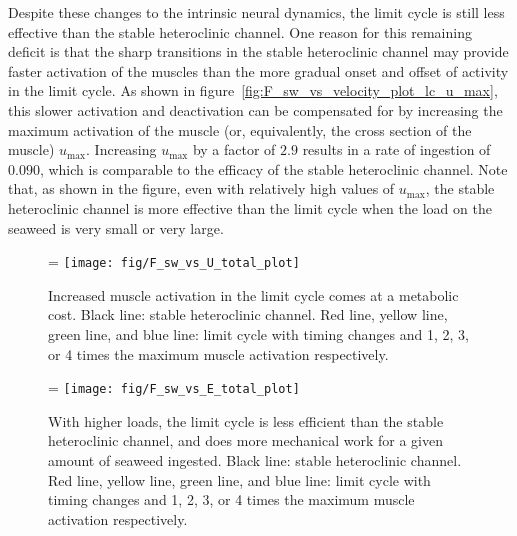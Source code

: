 Despite these changes to the intrinsic neural dynamics, the limit cycle is
still less effective than the stable heteroclinic channel.  One reason for
this remaining deficit is that the sharp transitions in the stable heteroclinic channel may
provide faster activation of the muscles than the more gradual onset and
offset of activity in the limit cycle.  As shown in
figure~\ref{fig:F_sw_vs_velocity_plot_lc_u_max}, this slower activation and
deactivation can be compensated
for by increasing the maximum activation of the muscle (or, equivalently,
the cross section of the muscle) $u_\textrm{max}$.  Increasing
$u_\textrm{max}$ by a factor of $2.9$ results in a rate of ingestion of
$0.090$, which is comparable to the efficacy of the stable heteroclinic
channel.  Note that, as shown in the figure, even with relatively high
values of $u_\textrm{max}$, the stable heteroclinic channel is more
effective than the limit cycle when the load on the seaweed is very
small or very large.

\begin{figure}
    \ifthesis
        \linewidth
    \else
        \figwidth=\linewidth
    \fi
    \centering
    \texttt{[image: fig/F\_sw\_vs\_U\_total\_plot]}
    \caption[Metabolic cost of increased muscle activation]{
        Increased muscle activation in the limit cycle comes at a
        metabolic cost.  Black line: stable heteroclinic channel.  Red line,
        yellow line, green line, and blue line: limit cycle with timing changes
    and 1, 2, 3, or 4 times the maximum muscle activation respectively.}
    \label{fig:F_sw_vs_U_total_plot}
\end{figure}

\begin{figure}
    \ifthesis
        \linewidth
    \else
        \figwidth=\linewidth
    \fi
    \centering
    \texttt{[image: fig/F\_sw\_vs\_E\_total\_plot]}
    \caption[Mechanical efficiency of the limit cycle]{
        With higher loads, the limit cycle is less efficient
        than the stable heteroclinic channel, and does more mechanical
        work for a given amount of seaweed ingested.  Black line: stable
        heteroclinic channel.  Red line, yellow line, green line, and blue
        line: limit cycle with timing changes and 1, 2, 3, or 4 times the
        maximum muscle activation respectively.
    }
    \label{fig:F_sw_vs_E_total_plot}
\end{figure}

